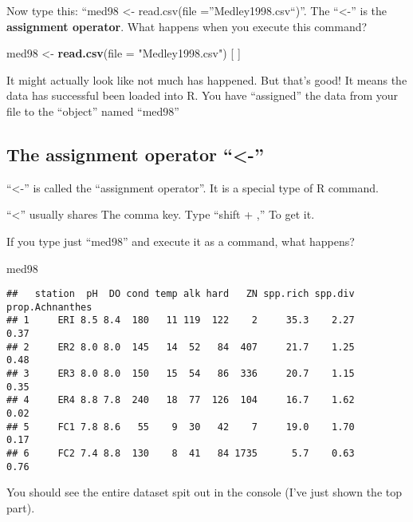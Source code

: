 \documentclass[]{book}
\newenvironment{Shaded}{\begin{snugshade}}{\end{snugshade}}
\newcommand{\KeywordTok}[1]{\textcolor[rgb]{0.13,0.29,0.53}{\textbf{#1}}}
\newcommand{\DataTypeTok}[1]{\textcolor[rgb]{0.13,0.29,0.53}{#1}}
\newcommand{\StringTok}[1]{\textcolor[rgb]{0.31,0.60,0.02}{#1}}
\newcommand{\NormalTok}[1]{#1}
\theoremstyle{definition}
\theoremstyle{definition}
\theoremstyle{definition}
\theoremstyle{remark}
\begin{document}
Now type this: ``med98 \textless{}- read.csv(file
=''Medley1998.csv``)''. The ``\textless{}-'' is the \textbf{assignment
operator}. What happens when you execute this command?

\begin{Shaded}
\begin{Highlighting}[]
\NormalTok{med98 <-}\StringTok{ }\KeywordTok{read.csv}\NormalTok{(}\DataTypeTok{file =} \StringTok{"Medley1998.csv"}\NormalTok{) [ ]}
\end{Highlighting}
\end{Shaded}

It might actually look like not much has happened. But that's good! It
means the data has successful been loaded into R. You have ``assigned''
the data from your file to the ``object'' named ``med98''

\subsection{\texorpdfstring{The assignment operator
``\textless{}-''}{The assignment operator \textless{}-}}\label{the-assignment-operator--}

``\textless{}-'' is called the ``assignment operator''. It is a special
type of R command.

``\textless{}'' usually shares The comma key. Type ``shift + ,'' To get
it.

If you type just ``med98'' and execute it as a command, what happens?

\begin{Shaded}
\begin{Highlighting}[]
\NormalTok{med98}
\end{Highlighting}
\end{Shaded}

\begin{verbatim}
##   station  pH  DO cond temp alk hard   ZN spp.rich spp.div prop.Achnanthes
## 1     ERI 8.5 8.4  180   11 119  122    2     35.3    2.27            0.37
## 2     ER2 8.0 8.0  145   14  52   84  407     21.7    1.25            0.48
## 3     ER3 8.0 8.0  150   15  54   86  336     20.7    1.15            0.35
## 4     ER4 8.8 7.8  240   18  77  126  104     16.7    1.62            0.02
## 5     FC1 7.8 8.6   55    9  30   42    7     19.0    1.70            0.17
## 6     FC2 7.4 8.8  130    8  41   84 1735      5.7    0.63            0.76
\end{verbatim}

You should see the entire dataset spit out in the console (I've just
shown the top part).
\end{document}
